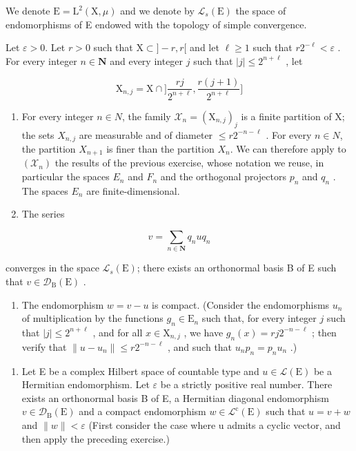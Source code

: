 We denote \(\mathrm{E}=\mathrm{L}^{2}(\mathrm{X},\mu)\) and we denote by \(\mathcal{L}_{s}(\mathrm{E})\) the space of endomorphisms of E endowed with the topology of simple convergence.

Let \(\varepsilon > 0\). Let \(r > 0\) such that \(\mathrm{X} \subset ] - r, r[\) and let \(\ell \geqslant 1\) such that \(r2^{-\ell} < \varepsilon\) . For every integer \(n \in \mathbf{N}\) and every integer \(j\) such that \(|j| \leqslant 2^{n + \ell}\) , let

\[
\mathrm{X} _ {n, j} = \mathrm{X} \cap \Big ] \frac {r j}{2 ^ {n + \ell}}, \frac {r (j + 1)}{2 ^ {n + \ell}} \Big ]
\]

\begin{enumerate}
\def\labelenumi{\alph{enumi})}
\item
  For every integer \(n \in N\), the family \(\mathcal{X}_{n} = (\mathrm{X}_{n,j})_{j}\) is a finite partition of X; the sets \(X_{n,j}\) are measurable and of diameter \(\leqslant r2^{-n-\ell}\) . For every \(n \in N\), the partition \(X_{n+1}\) is finer than the partition \(X_{n}\). We can therefore apply to \((\mathcal{X}_{n})\) the results of the previous exercise, whose notation we reuse, in particular the spaces \(E_{n}\) and \(F_{n}\) and the orthogonal projectors \(p_{n}\) and \(q_{n}\) . The spaces \(E_{n}\) are finite-dimensional.
\item
  The series
\end{enumerate}

\[
v = \sum_ {n \in \mathbf {N}} q _ {n} u q _ {n}
\]

converges in the space \(\mathcal{L}_{s}(\mathrm{E})\); there exists an orthonormal basis B of E such that \(v \in \mathcal{D}_{\mathrm{B}}(\mathrm{E})\) .

\begin{enumerate}
\def\labelenumi{\alph{enumi})}
\setcounter{enumi}{2}
\tightlist
\item
  The endomorphism \(w = v - u\) is compact. (Consider the endomorphisms \(u_n\) of multiplication by the functions \(g_n \in \mathrm{E}_n\) such that, for every integer \(j\) such that \(|j| \leqslant 2^{n + \ell}\) , and for all \(x \in \mathrm{X}_{n,j}\) , we have \(g_n(x) = rj2^{-n - \ell}\) ; then verify that \(\| u - u_n \| \leqslant r2^{-n - \ell}\) , and such that \(u_n p_n = p_n u_n\) .)
\end{enumerate}

\begin{enumerate}
\def\labelenumi{\arabic{enumi})}
\setcounter{enumi}{19}
\tightlist
\item
  Let E be a complex Hilbert space of countable type and \(u \in \mathcal{L}(\mathrm{E})\) be a Hermitian endomorphism. Let \(\varepsilon\) be a strictly positive real number. There exists an orthonormal basis B of E, a Hermitian diagonal endomorphism \(v \in \mathcal{D}_{\mathrm{B}}(\mathrm{E})\) and a compact endomorphism \(w \in \mathcal{L}^{\mathrm{c}}(\mathrm{E})\) such that \(u = v + w\) and \(\|w\| < \varepsilon\) (First consider the case where u admits a cyclic vector, and then apply the preceding exercise.)
\end{enumerate}

